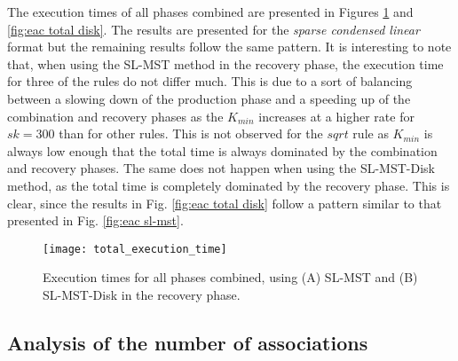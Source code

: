 
The execution times of all phases combined are presented in Figures \ref{fig:eac total mem} and \ref{fig:eac total disk}.
The results are presented for the \emph{sparse condensed linear} format but the remaining results follow the same pattern.
It is interesting to note that, when using the SL-MST method in the recovery phase, the execution time for three of the rules do not differ much.
This is due to a sort of balancing between a slowing down of the production phase and a speeding up of the combination and recovery phases as the $K_{min}$ increases at a higher rate for $sk=300$ than for other rules.
This is not observed for the $sqrt$ rule as $K_{min}$ is always low enough that the total time is always dominated by the combination and recovery phases.
The same does not happen when using the SL-MST-Disk method, as the total time is completely dominated by the recovery phase.
This is clear, since the results in Fig. \ref{fig:eac total disk} follow a pattern similar to that presented in Fig. \ref{fig:eac sl-mst}.

\begin{figure}[hbt!]
    \centering
    \texttt{[image: total\_execution\_time]}
    \caption{Execution times for all phases combined, using (A) SL-MST and (B) SL-MST-Disk in the recovery phase.}
    \label{fig:eac total mem}
\end{figure}




\subsection{Analysis of the number of associations}


